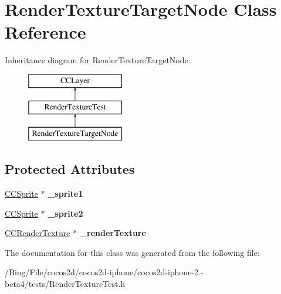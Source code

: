 \hypertarget{interface_render_texture_target_node}{\section{Render\-Texture\-Target\-Node Class Reference}
\label{interface_render_texture_target_node}
}
Inheritance diagram for Render\-Texture\-Target\-Node\-:\begin{figure}[H]
\begin{center}
\leavevmode
\includegraphics[height=3.000000cm]{interface_render_texture_target_node}
\end{center}
\end{figure}
\subsection*{Protected Attributes}
\begin{DoxyCompactItemize}
\item 
\hypertarget{interface_render_texture_target_node_a8a553de085537b159f4f6b41965731d0}{\hyperlink{class_c_c_sprite}{C\-C\-Sprite} $\ast$ {\bfseries \-\_\-sprite1}}\label{interface_render_texture_target_node_a8a553de085537b159f4f6b41965731d0}

\item 
\hypertarget{interface_render_texture_target_node_ae4797e5e599635635743f81f684383cb}{\hyperlink{class_c_c_sprite}{C\-C\-Sprite} $\ast$ {\bfseries \-\_\-sprite2}}\label{interface_render_texture_target_node_ae4797e5e599635635743f81f684383cb}

\item 
\hypertarget{interface_render_texture_target_node_abf4b5cb55febd963e8ff3e71fdf525ac}{\hyperlink{class_c_c_render_texture}{C\-C\-Render\-Texture} $\ast$ {\bfseries \-\_\-render\-Texture}}\label{interface_render_texture_target_node_abf4b5cb55febd963e8ff3e71fdf525ac}

\end{DoxyCompactItemize}


The documentation for this class was generated from the following file\-:\begin{DoxyCompactItemize}
\item 
/\-Bing/\-File/cocos2d/cocos2d-\/iphone/cocos2d-\/iphone-\/2.-\/beta4/tests/Render\-Texture\-Test.\-h\end{DoxyCompactItemize}
